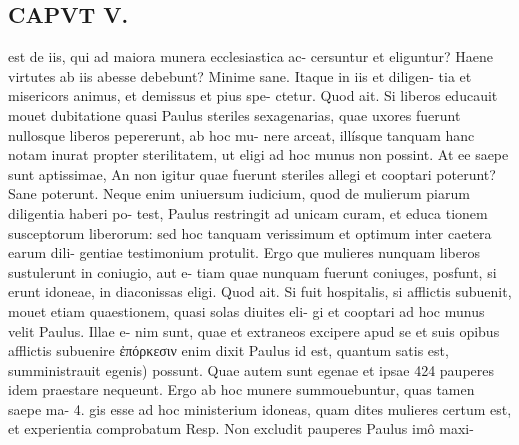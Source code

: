 \documentclass{article}
\begin{document}
\begin{pages}
\section*{CAPVT  V. }
\marginpar{[ p.279 ]}est de iis, qui ad maiora munera ecclesiastica ac- cersuntur et eliguntur? Haene virtutes ab iis abesse debebunt? Minime sane. Itaque in iis et diligen- tia et misericors animus, et demissus et pius spe- ctetur. Quod ait. Si liberos educauit mouet dubitatione quasi Paulus steriles sexagenarias, quae uxores fuerunt nullosque liberos pepererunt, ab hoc mu- nere arceat, illísque tanquam hanc notam inurat propter sterilitatem, ut eligi ad hoc munus non possint. At ee saepe sunt aptissimae, An non igitur quae fuerunt steriles allegi et cooptari poterunt? Sane poterunt. Neque enim uniuersum iudicium, quod de mulierum piarum diligentia haberi po- test, Paulus restringit ad unicam curam, et educa tionem susceptorum liberorum: sed hoc tanquam verissimum et optimum inter caetera earum dili- gentiae testimonium protulit. Ergo que mulieres nunquam liberos sustulerunt in coniugio, aut e- tiam quae nunquam fuerunt coniuges, posfunt, si erunt idoneae, in diaconissas eligi.  Quod ait. Si fuit hospitalis, si afflictis subuenit, mouet etiam quaestionem, quasi solas diuites eli- gi et cooptari ad hoc munus velit Paulus. Illae e- nim sunt, quae et extraneos excipere apud se et suis opibus afflictis subuenire ἐπόρκεσιν enim dixit Paulus id est, quantum satis est, sumministrauit egenis) possunt. Quae autem sunt egenae et ipsae 424 pauperes idem praestare nequeunt. Ergo ab hoc munere summouebuntur, quas tamen saepe ma- 4. gis esse ad hoc ministerium idoneas, quam dites mulieres certum est, et experientia comprobatum Resp. Non excludit pauperes Paulus imô maxi- 

\end{pages}
\end{document}
